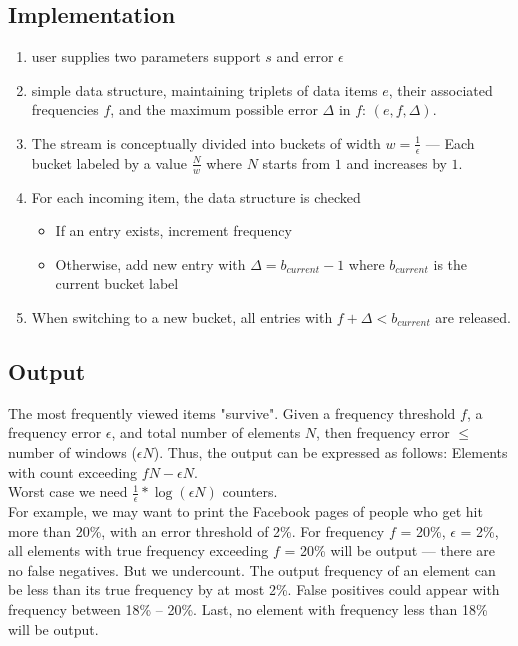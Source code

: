 \documentclass[a4paper, 12pt]{book} %
\begin{document}
\subsection{Implementation}
\begin{enumerate}
	\item user supplies two parameters support $s$ and error $\epsilon$
	\item simple data structure, maintaining triplets of data items $e$, their associated frequencies $f$, and the maximum possible error $\Delta$ in $f$: $(e, f, \Delta)$.
	\item The stream is conceptually divided into buckets of width $w=\frac{1}{\epsilon}$ --- Each bucket labeled by a value $\frac{N}{w}$ where $N$ starts from $1$ and increases by $1$.
	\item For each incoming item, the data structure is checked
	\begin{itemize}
		\item If an entry exists, increment frequency
		\item Otherwise, add new entry with $\Delta=b_{current}-1$ where $b_{current}$ is the current bucket label
	\end{itemize}  
	\item When switching to a new bucket, all entries with $f+\Delta < b_{current}$ are released.
\end{enumerate}

\subsection{Output}
The most frequently viewed items "survive". Given a frequency threshold $f$, a frequency error $\epsilon$, and total number of elements $N$, then frequency error $\le$ number of windows ($\epsilon N$). Thus, the output can be expressed as follows: Elements with count exceeding $fN - \epsilon N$. \\

Worst case we need $\frac{1}{\epsilon} * \log{(\epsilon N)}$ counters.\\

For example, we may want to print the Facebook pages of people who get hit more than 20\%, with an error threshold of 2\%. For frequency $f$ = 20\%, $\epsilon$ = 2\%, all elements with true frequency exceeding $f$ = 20\% will be output --- there are no false negatives. But we undercount. The output frequency of an element can be less than its true frequency by at most 2\%. False positives could appear with frequency between 18\% -- 20\%. Last, no element with frequency less than 18\% will be output.
\end{document}

